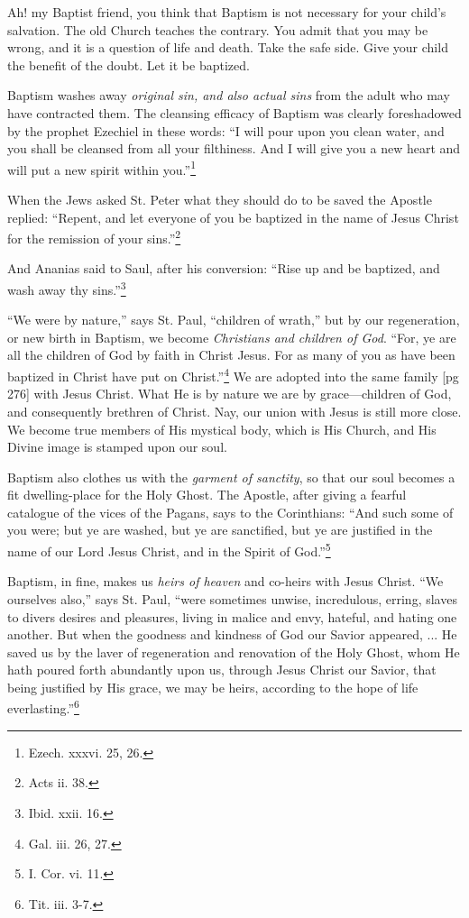 Ah! my Baptist friend, you think that Baptism
is not necessary for your child's salvation. The
old Church teaches the contrary. You admit that
you may be wrong, and it is a question of life and
death. Take the safe side. Give your child the
benefit of the doubt. Let it be baptized.

Baptism washes away \emph{original sin, and also
actual sins} from the adult who may have contracted
them. The cleansing efficacy of Baptism
was clearly foreshadowed by the prophet Ezechiel
in these words: “I will pour upon you clean
water, and you shall be cleansed from all your
filthiness. And I will give you a new heart and
will put a new spirit within you.”\footnote{Ezech. xxxvi. 25, 26.}

When the Jews asked St. Peter what they
should do to be saved the Apostle replied: “Repent,
and let everyone of you be baptized in the
name of Jesus Christ for the remission of your
sins.”\footnote{Acts ii. 38.}

And Ananias said to Saul, after his conversion:
“Rise up and be baptized, and wash away
thy sins.”\footnote{Ibid. xxii. 16.}

“We were by nature,” says St. Paul, “children
of wrath,” but by our regeneration, or new
birth in Baptism, we become \emph{Christians and children
of God}. “For, ye are all the children of
God by faith in Christ Jesus. For as many of
you as have been baptized in Christ have put on
Christ.”\footnote{Gal. iii. 26,
27.} We are adopted into the same family
[pg 276]
with Jesus Christ. What He is by nature we are
by grace—children of God, and consequently
brethren of Christ. Nay, our union with Jesus is
still more close. We become true members of His
mystical body, which is His Church, and His Divine
image is stamped upon our soul.

Baptism also clothes us with the \emph{garment of
sanctity}, so that our soul becomes a fit dwelling-place
for the Holy Ghost. The Apostle, after giving
a fearful catalogue of the vices of the Pagans,
says to the Corinthians: “And such some of you
were; but ye are washed, but ye are sanctified,
but ye are justified in the name of our Lord Jesus
Christ, and in the Spirit of God.”\footnote{I. Cor. vi. 11.}

Baptism, in fine, makes us \emph{heirs of heaven} and
co-heirs with Jesus Christ. “We ourselves also,”
says St. Paul, “were sometimes unwise, incredulous,
erring, slaves to divers desires and pleasures,
living in malice and envy, hateful, and
hating one another. But when the goodness and
kindness of God our Savior appeared, ... He
saved us by the laver of regeneration and renovation
of the Holy Ghost, whom He hath poured
forth abundantly upon us, through Jesus Christ
our Savior, that being justified by His grace, we
may be heirs, according to the hope of life everlasting.”\footnote{Tit.
iii. 3-7.}

